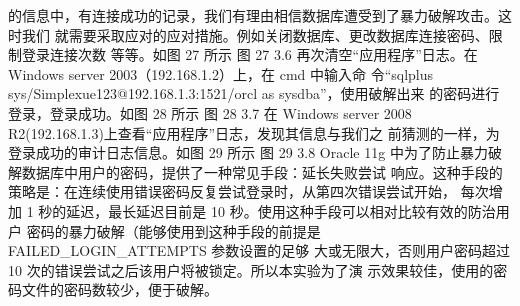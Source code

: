 的信息中，有连接成功的记录，我们有理由相信数据库遭受到了暴力破解攻击。这时我们
就需要采取应对的应对措施。例如关闭数据库、更改数据库连接密码、限制登录连接次数
等等。如图 27 所示
图 27
3.6 再次清空“应用程序”日志。在 Windows server 2003（192.168.1.2）上，在 cmd 中输入命
令“sqlplus sys/Simplexue123@192.168.1.3:1521/orcl as sysdba”，使用破解出来
的密码进行登录，登录成功。如图 28 所示
图 28
3.7 在 Windows server 2008 R2(192.168.1.3)上查看“应用程序”日志，发现其信息与我们之
前猜测的一样，为登录成功的审计日志信息。如图 29 所示
图 29
3.8 Oracle 11g 中为了防止暴力破解数据库中用户的密码，提供了一种常见手段：延长失败尝试
响应。这种手段的策略是：在连续使用错误密码反复尝试登录时，从第四次错误尝试开始，
每次增加 1 秒的延迟，最长延迟目前是 10 秒。使用这种手段可以相对比较有效的防治用户
密码的暴力破解（能够使用到这种手段的前提是 FAILED_LOGIN_ATTEMPTS 参数设置的足够
大或无限大，否则用户密码超过 10 次的错误尝试之后该用户将被锁定。所以本实验为了演
示效果较佳，使用的密码文件的密码数较少，便于破解。
